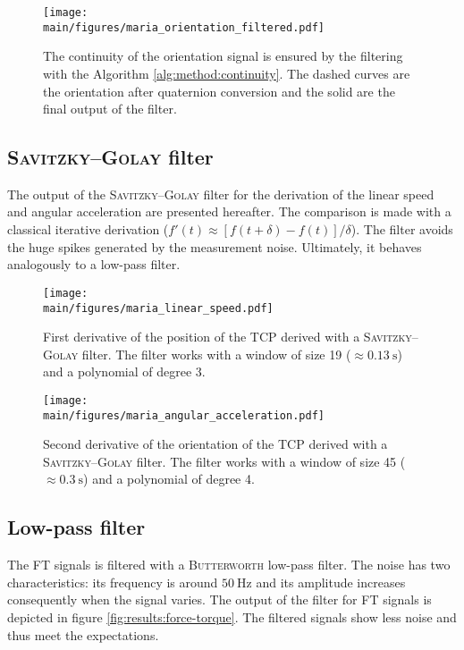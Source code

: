 \documentclass[/home/francois/latex/report/main.tex]{subfiles}
\begin{document}
\begin{figure}
  \centering
  \texttt{[image: \\main/figures/maria\_orientation\_filtered.pdf]}
  \caption{The continuity of the orientation signal is ensured by the filtering with the Algorithm \ref{alg:method:continuity}. The dashed curves are the orientation after quaternion conversion and the solid are the final output of the filter.}
  \label{fig:results:orientation-filtered}
\end{figure}

\subsection{\textsc{Savitzky–Golay} filter}

The output of the \textsc{Savitzky–Golay} filter for the derivation of the linear speed and angular acceleration are presented hereafter. The comparison is made with a classical iterative derivation ($f'(t) \approx  [f(t+\delta) - f(t)] / \delta$). The filter avoids the huge spikes generated by the measurement noise. Ultimately, it behaves analogously to a low-pass filter.


\begin{figure}
  \centering
  \texttt{[image: \\main/figures/maria\_linear\_speed.pdf]}
  \caption{First derivative of the position of the \ac{TCP} derived with a \textsc{Savitzky–Golay} filter. The filter works with a window of size 19 ($\approx 0.13 \ \si{\second}$) and a polynomial of degree 3.}
  \label{fig:results:linear-speed-filtered}
\end{figure}

\begin{figure}
  \centering
  \texttt{[image: \\main/figures/maria\_angular\_acceleration.pdf]}
  \caption{Second derivative of the orientation of the \ac{TCP} derived with a \textsc{Savitzky–Golay} filter. The filter works with a window of size 45 ($\approx 0.3 \ \si{\second}$) and a polynomial of degree 4.}
  \label{fig:results:angular-acceleration-filtered}
\end{figure}

\subsection{Low-pass filter}

The \ac{FT} signals is filtered with a \textsc{Butterworth} low-pass filter. The noise has two characteristics: its frequency is around $50 \ \si{\hertz}$ and its amplitude increases consequently when the signal varies. The output of the filter for \ac{FT} signals is depicted in figure \ref{fig:results:force-torque}. The filtered signals show less noise and thus meet the expectations.
\end{document}
